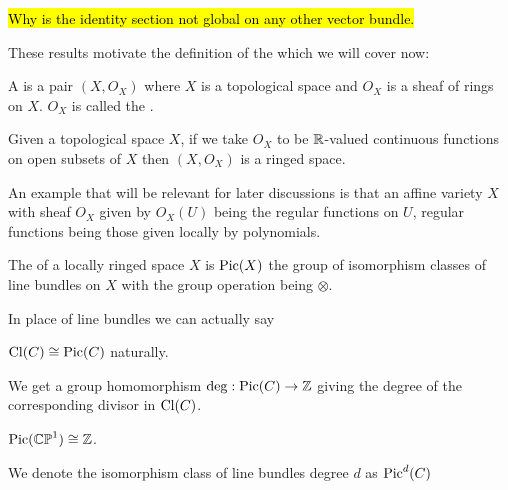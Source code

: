\documentclass{article}
\begin{document}
\begin{remark}
	\hl{Why is the identity section not global on any other vector bundle.}
\end{remark}

These results motivate the definition of the  which we will cover now:

\begin{definition}
	A  is a pair $(X,O_X)$ where $X$ is a topological space and $O_X$ is a sheaf of rings on $X$. $O_X$ is called the . 
\end{definition}

\begin{example}
	Given a topological space $X$, if we take $O_X$ to be $\mathbb{R}$-valued continuous functions on open subsets of $X$ then $(X,O_X)$ is a ringed space. 
\end{example}

\begin{example}
	An example that will be relevant for later discussions is that an affine variety $X$ with sheaf $O_X$ given by $O_X(U)$ being the regular functions on $U$, regular functions being those given locally by polynomials. 
\end{example}

\begin{definition}
	The  of a locally ringed space $X$ is $\operatorname{Pic}(X)$ the group of isomorphism classes of line bundles on $X$ with the group operation being $\otimes$. 
\end{definition}

\begin{remark}
	In place of line bundles we can actually say  
\end{remark}

\begin{theorem}
	$\operatorname{Cl}(C) \cong \operatorname{Pic}(C)$ naturally. 
\end{theorem}
\begin{corollary}
	We get a group homomorphism $\deg:\operatorname{Pic}(C) \to \mathbb{Z}$ giving the degree of the corresponding divisor in $\operatorname{Cl}(C)$. 
\end{corollary}
\begin{corollary}
	$\operatorname{Pic}(\mathbb{CP}^1) \cong \mathbb{Z}$. 
\end{corollary}

\begin{notation}
    We denote the isomorphism class of line bundles degree $d$ as $\operatorname{Pic}^d(C)$
\end{notation}
\end{document}
